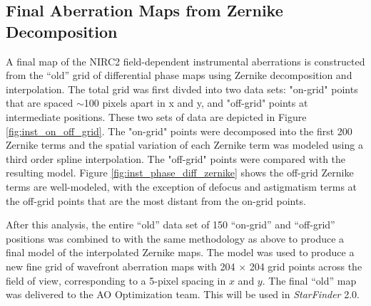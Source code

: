 \subsection{Final Aberration Maps from Zernike Decomposition}
\label{sec:inst_zernike}

A final map of the NIRC2 field-dependent instrumental aberrations is 
constructed from the ``old'' grid of differential phase maps using Zernike decomposition and interpolation.  The total grid was first divded into two 
data sets: "on-grid" points that are spaced $\sim$100 pixels apart in x and y, and "off-grid" points at intermediate positions. These two sets of data are depicted in Figure \ref{fig:inst_on_off_grid}. The "on-grid" points were decomposed into the first 200 Zernike terms and the spatial variation of each Zernike term was modeled using a third order spline interpolation. The "off-grid" points were compared with the resulting model. Figure \ref{fig:inst_phase_diff_zernike} shows the off-grid Zernike terms are well-modeled, with the exception of defocus and astigmatism terms at the off-grid points that are the most distant from the on-grid points. 

After this analysis, the entire ``old'' data set of 150 ``on-grid'' and ``off-grid'' positions was combined to with the same methodology as above to produce a final model of the interpolated Zernike maps.
The model was used to produce a new fine grid of wavefront aberration maps with 204 $\times$ 204 grid points across the field of view, corresponding to a 5-pixel spacing in $x$ and $y$. 
The final ``old'' map was delivered to the AO Optimization team. This will be used in \textit{StarFinder} 2.0.
  
  